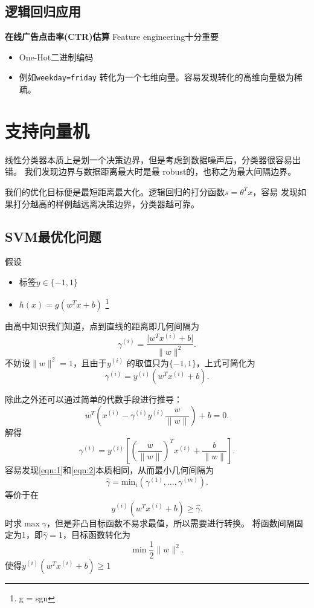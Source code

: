 \subsection{逻辑回归应用}
\noindent \textbf{在线广告点击率(CTR)估算}
Feature engineering十分重要
\begin{itemize}
		\item One-Hot二进制编码 
        \item 例如\verb|weekday=friday| 转化为一个七维向量。容易发现转化的高维向量极为稀疏。		
\end{itemize}

\section{支持向量机} 
线性分类器本质上是划一个决策边界，但是考虑到数据噪声后，分类器很容易出错。
我们发现边界与数据距离最大时是最
robust的，也称之为最大间隔边界。

我们的优化目标便是最短距离最大化。逻辑回归的打分函数$s=\theta^{T} x$，容易
发现如果打分越高的样例越远离决策边界，分类器越可靠。

\subsection{SVM最优化问题}
假设
\begin{itemize}
		\item 标签$y \in \{-1,1\} $ 
		\item $h\left( x \right) = g\left( w^{T}x + b \right) $ \footnote{g = sgn}
\end{itemize}
由高中知识我们知道，点到直线的距离即几何间隔为
\[
		\gamma^{(i)} = \frac{ \lvert w^{T}x^{(i)} + b   \rvert }{\|w\|^2}
.\]
不妨设$\|w\|^2 = 1$，且由于$y^{(i)}$ 的取值只为$\{-1,1\} $，上式可简化为
\begin{equation}	
		\gamma^{(i)} = y^{(i)} \left( w^{T}x^{(i)} + b \right) \label{eqn:1}
.\end{equation}
 
除此之外还可以通过简单的代数手段进行推导：
\[
		w^{T} \left( x^{(i)} - \gamma^{(i)} y^{(i)} \frac{w}{\|w\|} \right)  + b= 0
.\] 
解得
\begin{equation}
		\gamma^{(i)} = y^{(i)} \left[ \left( \frac{w}{\|w\|} \right) ^{T} x^{(i)} + \frac{b}{\|w\|} \right] \label{eqn:2}
.\end{equation}
容易发现\eqref{eqn:1}和\eqref{eqn:2}本质相同，从而最小几何间隔为
\[
		\hat{ \gamma} = \mathrm{min}_{i} \left( \gamma^{(1)},\ldots, \gamma^{(m)} \right) 
.\] 
等价于在
\[
		y^{(i)} \left( w^{T}x^{(i)}  + b \right) \ge  \hat{\gamma}
.\] 
时求$\max \gamma$，但是非凸目标函数不易求最值，所以需要进行转换。
将函数间隔固定为1，即$\hat{\gamma} = 1$，目标函数转化为
\[
\min \frac{1}{2} \|w \|^2
.\] 
使得$y^{(i)} \left( w^{T}x^{(i)} + b \right)  \ge  1$

